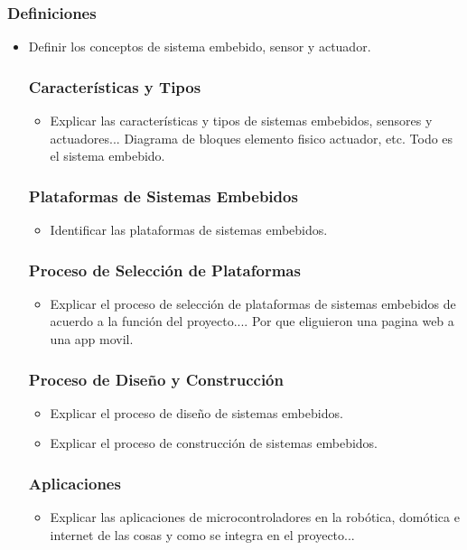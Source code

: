 \documentclass[a4paper,12pt]{article}
\begin{document}
	\subsubsection{Definiciones}
	\begin{itemize}
		\item Definir los conceptos de sistema embebido, sensor y actuador.
		
		\subsubsection{Características y Tipos}
		\begin{itemize}
			\item Explicar las características y tipos de sistemas embebidos, sensores y actuadores... Diagrama de bloques elemento fisico actuador, etc. Todo es el sistema embebido.
		\end{itemize}
		\subsubsection{Plataformas de Sistemas Embebidos}
		\begin{itemize}
			\item Identificar las plataformas de sistemas embebidos.
		\end{itemize}
		\subsubsection{Proceso de Selección de Plataformas}
		\begin{itemize}
			\item Explicar el proceso de selección de plataformas de sistemas embebidos de acuerdo a la función del proyecto.... Por que eliguieron una pagina web a una app movil.
		\end{itemize}
		\subsubsection{Proceso de Diseño y Construcción}
		\begin{itemize}
			\item Explicar el proceso de diseño de sistemas embebidos.
			\item Explicar el proceso de construcción de sistemas embebidos.
		\end{itemize}
		\subsubsection{Aplicaciones}
		\begin{itemize}
			\item Explicar las aplicaciones de microcontroladores en la robótica, domótica e internet de las cosas y como se integra en el proyecto... 
		\end{itemize}
	\end{itemize}
		
\end{document}
